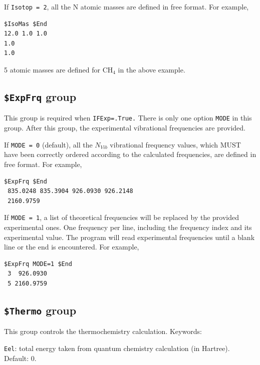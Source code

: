 \documentclass[12pt,english]{extarticle}
\begin{document}
\bigskip{}
If \verb|Isotop = 2|, all the N atomic masses are defined in free format.
For example,
\begin{Verbatim}[frame=single]
 $IsoMas $End
12.0 1.0 1.0
1.0
1.0
\end{Verbatim}
5 atomic masses are defined for CH$_4$ in the above example.


\subsection{\texttt{\$ExpFrq} group} \label{sec:inp-expfrq}

This group is required when \verb|IFExp=.True.| There is only one option
\verb|MODE| in this group. After this group, the experimental vibrational
frequencies are provided.

\bigskip{}
If \verb|MODE = 0| (default), all the $N_{Vib}$ vibrational frequency values, which MUST have been correctly
ordered according to the calculated frequencies, are defined in free format. For example,
\begin{Verbatim}[frame=single]
 $ExpFrq $End
 835.0248 835.3904 926.0930 926.2148
 2160.9759
\end{Verbatim}

If \verb|MODE = 1|, a list of theoretical frequencies will be replaced by
the provided experimental ones. One frequency per line, including the
frequency index and its experimental value. The program will
read experimental frequencies until a blank line or the end is encountered.
For example,
\begin{Verbatim}[frame=single]
 $ExpFrq MODE=1 $End
 3  926.0930
 5 2160.9759
\end{Verbatim}


\subsection{\texttt{\$Thermo} group} \label{sec:inp-thermo}

This group controls the thermochemistry calculation. Keywords:

\bigskip{}
\verb|Eel|: total energy taken from quantum chemistry calculation (in Hartree). Default: 0.
\end{document}
